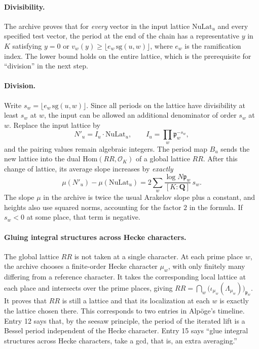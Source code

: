 \documentclass[11pt]{article}
\newcommand{\Q}{\mathbf{Q}}
\begin{document}
\paragraph{Divisibility.} The archive proves that for \emph{every} vector in the input lattice $\mathrm{NuLat}_u$ and every specified test vector, the period at the end of the chain has a representative $y$ in $K$ satisfying $y=0$ or $v_w(y)\ge\lfloor e_w\,\mathrm{sg}(u,w)\rfloor$, where $e_w$ is the ramification index. The lower bound holds on the entire lattice, which is the prerequisite for ``division'' in the next step.

\paragraph{Division.} Write $s_w=\lfloor e_w\,\mathrm{sg}(u,w)\rfloor$. Since all periods on the lattice have divisibility at least $s_w$ at $w$, the input can be allowed an additional denominator of order $s_w$ at $w$. Replace the input lattice by
\[
N'_u=I_u\cdot\mathrm{NuLat}_u,\qquad I_u=\prod_{w}\mathfrak p_w^{-s_w},
\]
and the pairing values remain algebraic integers. The period map $B_u$ sends the new lattice into the dual $\mathrm{Hom}(RR,\mathcal O_K)$ of a global lattice $RR$. After this change of lattice, its average slope increases by \emph{exactly}
\[
\mu(N'_u)-\mu(\mathrm{NuLat}_u)=2\sum_{w}\frac{\log N\mathfrak p_w}{[K:\Q]}\,s_w .
\]
The slope $\mu$ in the archive is twice the usual Arakelov slope plus a constant, and heights also use squared norms, accounting for the factor $2$ in the formula. If $s_w<0$ at some place, that term is negative.

\paragraph{Gluing integral structures across Hecke characters.} The global lattice $RR$ is not taken at a single character. At each prime place $w$, the archive chooses a finite-order Hecke character $\mu_w$, with only finitely many differing from a reference character. It takes the corresponding local lattice at each place and intersects over the prime places, giving $RR=\bigcap_w\bigl(\iota_{\mu_w}(\Lambda_{\mu_w})\bigr)_{\mathfrak p_w}$. It proves that $RR$ is still a lattice and that its localization at each $w$ is exactly the lattice chosen there. This corresponds to two entries in Alpöge's timeline. Entry 12 says that, by the seesaw principle, the period of the iterated lift is a Bessel period independent of the Hecke character. Entry 15 says ``glue integral structures across Hecke characters, take a gcd, that is, an extra averaging.''
\end{document}
